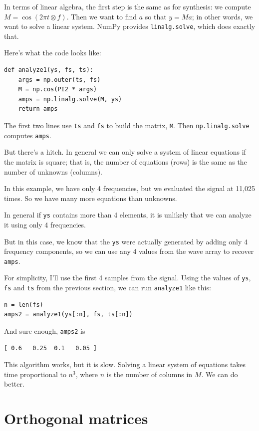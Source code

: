 \documentclass[12pt]{book}
\begin{document}
In terms of linear algebra, the first step is the same as for
synthesis: we compute $M = \cos (2 \pi t \otimes f)$.  Then we want
to find $a$ so that $y = M a$; in other words, we want to solve a
linear system.  NumPy provides {\tt linalg.solve}, which does
exactly that.

Here's what the code looks like:

\begin{verbatim}
def analyze1(ys, fs, ts):
    args = np.outer(ts, fs)
    M = np.cos(PI2 * args)
    amps = np.linalg.solve(M, ys)
    return amps
\end{verbatim}

The first two lines use {\tt ts} and {\tt fs} to build the
matrix, {\tt M}.  Then {\tt np.linalg.solve} computes {\tt amps}.

But there's a hitch.  In general we can only solve a system of linear
equations if the matrix is square; that is, the number of equations
(rows) is the same as the number of unknowns (columns).

In this example, we have only 4 frequencies, but we evaluated the
signal at 11,025 times.  So we have many more equations than unknowns.

In general if {\tt ys}
contains more than 4 elements, it is unlikely that we can analyze it
using only 4 frequencies.

But in this case, we know that the {\tt ys} were actually generated by
adding only 4 frequency components, so we can use any 4 values from
the wave array to recover {\tt amps}.

For simplicity, I'll use the first 4 samples from the signal.
Using the values of {\tt ys}, {\tt fs} and {\tt ts} from
the previous section, we can run {\tt analyze1} like this:

\begin{verbatim}
n = len(fs)
amps2 = analyze1(ys[:n], fs, ts[:n])
\end{verbatim}

And sure enough, {\tt amps2} is

\begin{verbatim}
[ 0.6   0.25  0.1   0.05 ]
\end{verbatim}

This algorithm works, but it is slow.  Solving a linear
system of equations takes time proportional to $n^3$, where $n$ is
the number of columns in $M$.  We can do better.


\section{Orthogonal matrices}
\end{document}
